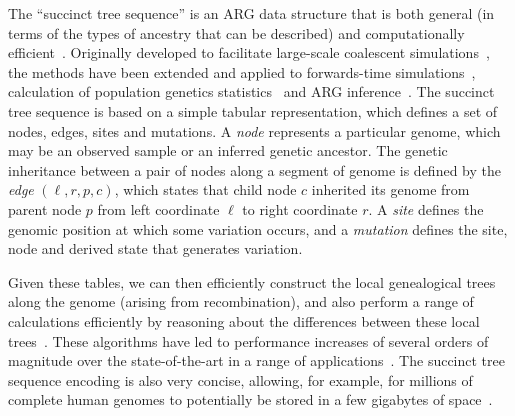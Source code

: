 \documentclass{article}
\begin{document}
The ``succinct tree sequence'' is an ARG data structure
that is both general (in terms of the types of ancestry that can
be described) and computationally efficient~\citep{Wong2023-efficient}.
Originally developed to facilitate large-scale coalescent
simulations~\citep{Kelleher2016-wk}, the methods have been
extended and applied to forwards-time
simulations~\citep{Kelleher2018-xc,Haller2018-tree},
calculation of population genetics statistics~\citep{Ralph2020-efficiently}
and ARG inference~\citep{Kelleher2019-ba,Wohns2022-th}.
The succinct tree sequence is based on a simple tabular representation,
which defines a set of nodes, edges, sites and mutations. A \emph{node}
represents a particular genome, which may be an observed sample
or an inferred genetic ancestor. The genetic inheritance between
a pair of nodes along a segment of genome is defined by
the \emph{edge} $(\ell, r, p, c)$, which states that
child node $c$ inherited its genome from parent node $p$
from left coordinate $\ell$ to right coordinate $r$. A \emph{site}
defines the genomic position at which some variation occurs,
and a \emph{mutation} defines the site, node and derived state
that generates variation.

Given these tables, we can then efficiently construct the local
genealogical trees along the genome (arising from recombination),
and also perform a range of calculations efficiently by
reasoning about the differences between these local
trees~\citep{Kelleher2016-wk,Ralph2020-efficiently}. These
algorithms have led to performance increases of several orders
of magnitude over the state-of-the-art in a range of
applications~\citep{Kelleher2016-wk,Kelleher2018-xc,Kelleher2019-ba,
Ralph2020-efficiently,Baumdicker2022-ep}.
The succinct tree sequence encoding
is also very concise, allowing, for example, for millions of
complete human genomes to potentially be stored in a few gigabytes of
space~\citep{Kelleher2019-ba}.
\end{document}
